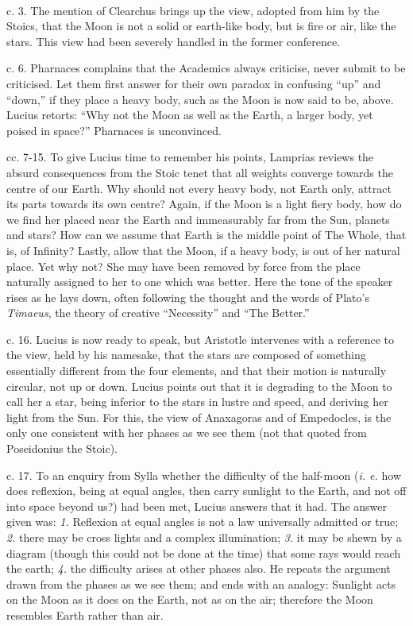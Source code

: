 \documentclass[a4paper, 11pt, oneside, polutonikogreek, english]{article}
\begin{document}
\paragraph{}
c. 3. The mention of Clearchus brings up the view, adopted from him by the Stoics, that the Moon is not a solid or earth-like body, but is fire or air, like the stars. This view had been severely handled in the former conference.

c. 6. Pharnaces complains that the Academics always criticise, never submit to be criticised. Let them first answer for their own paradox in confusing ``up'' and ``down,'' if they place a heavy body, such as the Moon is now said to be, above. Lucius retorts: ``Why not the Moon as well as the Earth, a larger body, yet poised in space?'' Pharnaces is unconvinced.

cc. 7-15. To give Lucius time to remember his points, Lamprias reviews the absurd consequences from the Stoic tenet that all weights converge towards the centre of our Earth. Why should not every heavy body, not Earth only, attract its parts towards its own centre? Again, if the Moon is a light fiery body, how do we find her placed near the Earth and immeasurably far from the Sun, planets and stars? How can we assume that Earth is the middle point of The Whole, that is, of Infinity? Lastly, allow that the Moon, if a heavy body, is out of her natural place. Yet why not? She may have been removed by force from the place naturally assigned to her to one which was better. Here the tone of the speaker rises as he lays down, often following the thought and the words of Plato's \emph{Timaeus}, the theory of creative ``Necessity'' and ``The Better.''

c. 16. Lucius is now ready to speak, but Aristotle intervenes with a reference to the view, held by his namesake, that the stars are composed of something essentially different from the four elements, and that their motion is naturally circular, not up or down. Lucius points out that it is degrading to the Moon to call her a star, being inferior to the stars in lustre and speed, and deriving her light from the Sun. For this, the view of Anaxagoras and of Empedocles, is the only one consistent with her phases as we see them (not that quoted from Poseidonius the Stoic).

c. 17. To an enquiry from Sylla whether the difficulty of the half-moon (\emph{i. e.} how does reflexion, being at equal angles, then carry sunlight to the Earth, and not off into space beyond us?) had been met, Lucius answers that it had. The answer given was: \emph{1.} Reflexion at equal angles is not a law universally admitted or true; \emph{2.} there may be cross lights and a complex illumination; \emph{3.} it may be shewn by a diagram (though this could not be done at the time) that some rays would reach the earth; \emph{4.} the difficulty arises at other phases also. He repeats the argument drawn from the phases as we see them; and ends with an analogy: Sunlight acts on the Moon as it does on the Earth, not as on the air; therefore the Moon resembles Earth rather than air.
\end{document}
